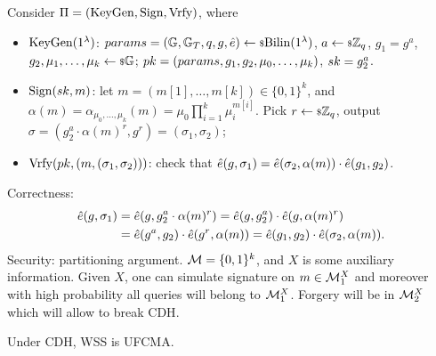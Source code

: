 \begin{construction}
	Consider $\Pi = (\mathrm{KeyGen}, \mathrm{Sign}, \mathrm{Vrfy})$, where
	\begin{itemize}
		\item $\mathrm{KeyGen}(1^{\lambda})$:
			$params = \left( \mathbb{G}, \mathbb{G}_{T}, q, g, \hat{e} \right) \leftarrow {\scriptstyle \$} {\mathrm{Bilin}(1^{\lambda})}$, $a \leftarrow {\scriptstyle \$} {\mathbb{Z}_q}$, $g_1 = g^a$, $g_2, \mu_1, \dots, \mu_k \leftarrow {\scriptstyle \$} {\mathbb{G}}$;
			$pk = (params, g_1, g_2, \mu_0, \dots, \mu_k)$, $sk = g_2^a$.
		\item $\mathrm{Sign}(sk, m)$:
			let $m = (m[1], \dots, m[k]) \in \{0,1\}^{k}$,
			and $\alpha(m) = \alpha_{\mu_0, \dots, \mu_k}(m) = \mu_0 \prod_{i=1}^{k} \mu_i^{m[i]}$.
			Pick $r \leftarrow {\scriptstyle \$} {\mathbb{Z}_q}$, output $\sigma = (g_2^a \cdot \alpha(m)^r, g^r) = (\sigma_1, \sigma_2)$;
		\item $\mathrm{Vrfy}(pk, (m, (\sigma_1, \sigma_2)))$:
			check that $\hat{e}(g, \sigma_1) = \hat{e}(\sigma_2, \alpha(m)) \cdot \hat{e}(g_1, g_2)$.
	\end{itemize}
	Correctness:
	\begin{align*}
		\hat{e}(g, \sigma_1) & = \hat{e}(g, g_2^a \cdot \alpha(m)^r) = \hat{e}(g, g_2^a) \cdot \hat{e}(g, \alpha(m)^r) \\
		& = \hat{e}(g^a, g_2) \cdot \hat{e}(g^r, \alpha(m)) = \hat{e}(g_1, g_2) \cdot \hat{e}(\sigma_2, \alpha(m)).
	\end{align*}
	Security: partitioning argument.
	$\mathcal{M} = \{0,1\}^k$, and $X$ is some auxiliary information.
	Given $X$, one can simulate signature on $m \in \mathcal{M}_1^X$ and moreover with high probability all queries will belong to $\mathcal{M}_1^X$.
	Forgery will be in $\mathcal{M}_2^X$ which will allow to break \ac{CDH}.
\end{construction}

\begin{theorem} \label{thm:waters-ss-ufcma}
	Under \ac{CDH}, \ac{WSS} is \ac{UFCMA}.
\end{theorem}

